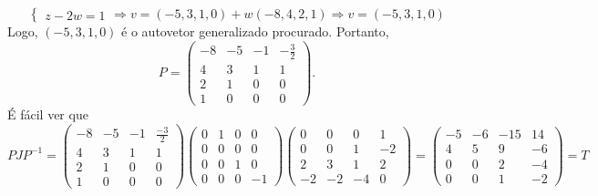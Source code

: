 \documentclass[11pt,a4paper]{article}
\begin{document}
{\[\begin{cases}
z - 2w = 1
\end{cases} \Rightarrow v = (-5,3,1, 0) + w(-8,4,2,1) \Rightarrow v = (-5,3,1,0)
\]
Logo, $(-5,3,1,0)$ é o autovetor generalizado procurado. Portanto,
\[
P = \begin{pmatrix}
-8 & -5 & -1 & -\frac{3}{2} \\
4 & 3 & 1 & 1 \\
2 & 1 & 0 & 0 \\
1 & 0 & 0 & 0
\end{pmatrix}.
\]
É fácil ver que
\[
PJP^{-1} = \left(\begin{matrix}
-8 & -5 & -1 & \frac{-3}{2} \\
4 & 3 & 1 & 1 \\
2 & 1 & 0 & 0 \\
1 & 0 & 0 & 0
\end{matrix}\right)\left(\begin{matrix}
0 & 1 & 0 & 0 \\
0 & 0 & 0 & 0 \\
0 & 0 & 1 & 0 \\
0 & 0 & 0 & -1
\end{matrix}\right)\left(\begin{matrix}
0 & 0 & 0 & 1 \\
0 & 0 & 1 & -2 \\
2 & 3 & 1 & 2 \\
-2 & -2 & -4 & 0
\end{matrix}\right) = \left(\begin{matrix}
-5 & -6 & -15 & 14 \\
4 & 5 & 9 & -6 \\
0 & 0 & 2 & -4 \\
0 & 0 & 1 & -2
\end{matrix}\right) = T
\]

}
\end{document}
